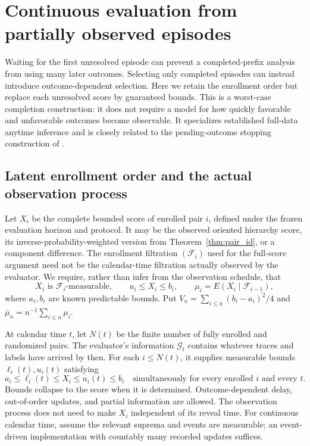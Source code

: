 \section{Continuous evaluation from partially observed episodes}
\label{app:asynchronous}

Waiting for the first unresolved episode can prevent a completed-prefix
analysis from using many later outcomes. Selecting only completed episodes
can instead introduce outcome-dependent selection. Here we retain the
enrollment order but replace each unresolved score by guaranteed bounds.
This is a worst-case completion construction: it does not require a model
for how quickly favorable and unfavorable outcomes become observable.
It specializes established full-data anytime inference and is closely
related to the pending-outcome stopping construction of
\citet{henzi2022forecast,henzi2022correction}.

\subsection{Latent enrollment order and the actual observation process}

Let $X_i$ be the complete bounded score of enrolled pair $i$, defined
under the frozen evaluation horizon and protocol. It may be the observed
oriented hierarchy score, its inverse-probability-weighted version from
Theorem~\ref{thm:pair_id}, or a component difference. The enrollment
filtration $(\mathcal F_i)$ used for the full-score argument need not be
the calendar-time filtration actually observed by the evaluator. We
require, rather than infer from the observation schedule, that
\[
 X_i\text{ is }\mathcal F_i\text{-measurable},\qquad
 a_i\leq X_i\leq b_i,\qquad
 \mu_i=E(X_i\mid\mathcal F_{i-1}),
\]
where $a_i,b_i$ are known predictable bounds. Put
$V_n=\sum_{i\leq n}(b_i-a_i)^2/4$ and
$\overline\mu_n=n^{-1}\sum_{i\leq n}\mu_i$.

At calendar time $t$, let $N(t)$ be the finite number of fully enrolled
and randomized pairs. The evaluator's information $\mathcal G_t$
contains whatever traces and labels have arrived by then. For each
$i\leq N(t)$, it supplies measurable bounds
$\ell_i(t),u_i(t)$ satisfying
\begin{equation}
 a_i\leq\ell_i(t)\leq X_i\leq u_i(t)\leq b_i
 \quad\text{simultaneously for every enrolled }i\text{ and every }t.
 \label{eq:async_enclosures}
\end{equation}
Bounds collapse to the score when it is determined. Outcome-dependent
delay, out-of-order updates, and partial information are allowed.
The observation process does not need to make $X_i$ independent of its
reveal time. For continuous calendar time, assume the relevant suprema
and events are measurable; an event-driven implementation with countably
many recorded updates suffices.

